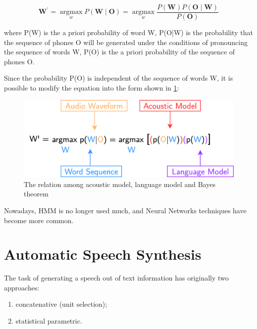\begin{equation}
    \boldsymbol{W}^{\prime}=\underset{w}{\operatorname{argmax}} P(\boldsymbol{W} \mid \boldsymbol{O})=\underset{w}{\operatorname{argmax}} \frac{P(\boldsymbol{W}) P(\boldsymbol{O} \mid \boldsymbol{W})}{P(\boldsymbol{O})}
\end{equation}




where P(W) is the a priori probability of word W, P(O|W) is the probability that the sequence of phones O will be generated under the conditions of pronouncing the sequence of words W, P(O) is the a priori probability of the sequence of phones O. 

Since the probability P(O) is independent of the sequence of words W, it is possible to modify the equation into the form shown in \cref{fig:bayes}:


\begin{figure}[H]
	\centering
	\includegraphics[width=\textwidth]{img/asr_bayes.png}
	\caption{The relation among acoustic model, language model and Bayes theorem}
	\label{fig:bayes}
\end{figure}

Nowadays, HMM is no longer used much, and Neural Networks techniques have become more common.

\section{Automatic Speech Synthesis}

The task of generating a speech out of text information has originally two approaches:
\begin{enumerate}
    \item concatenative (unit selection);
    \item statistical parametric.
\end{enumerate}

